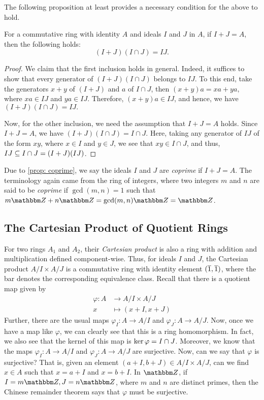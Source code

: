 The following proposition at least provides a necessary condition for the above to hold.
\begin{proposition}\label{prop: coprime}
    For a commutative ring with identity $A$ and ideals $I$ and $J$ in $A$, if $I+J = A$, then the following holds:
    \[(I+J)(I \cap J)=I J.\]
\end{proposition}
\begin{proof}
    We claim that the first inclusion holds in general. Indeed, it suffices to show that every generator of $(I+J)(I \cap J)$ belongs to $IJ$. To this end, take the generators $x+y$ of $(I+J)$ and $a$ of $I\cap J$, then $(x+y)a = xa + ya,$ where $xa \in IJ$ and $ya \in IJ$. Therefore, $(x+y)a \in IJ$, and hence, we have $(I+J)(I \cap J)=I J.$
    
    Now, for the other inclusion, we need the assumption that $I+J=A$ holds. Since $I+J = A$, we have $(I+J)(I\cap J) = I \cap J$. Here, taking any generator of $IJ$ of the form $xy$, where $x \in I$ and $y \in J$, we see that $xy \in I \cap J$, and thus, $IJ \ss I \cap J = (I+J)(IJ)$.
\end{proof}
Due to \cref{prop: coprime}, we say the ideals $I$ and $J$ are {\it coprime} if $I+J = A$. The terminology again came from the ring of integers, where two integers $m$ and $n$ are said to be {\it coprime} if $\operatorname{gcd}(m,n) = 1$ such that $m {\Z}+n {\Z}=\operatorname{gcd}(m, n) {\Z} = \Z$.

\subsection{The Cartesian Product of Quotient Rings}
For two rings $A_{1}$ and $A_{2}$, their {\it Cartesian product} is also a ring with addition and multiplication 
 defined component-wise. Thus, for ideals $I$ and $J$, the Cartesian product $A / I \times A / J$ is a commutative ring with identity element $(\ol{1}, \ol{1})$, where the bar denotes the corresponding equivalence class. Recall that there is a quotient map given by
    $$
    \begin{aligned}
    \varphi: A & \rightarrow A / I \times A / J \\
    x & \mapsto(x+I, x+J)
    \end{aligned}
    $$
 Further, there are the usual maps $\varphi_I: A \rightarrow A / I$
 and $\varphi_J: A \rightarrow A / J$.
Now, once we have a map like $\varphi$, we can clearly see that this is a ring homomorphism. In fact, we also see that the kernel of this map is $\Ker{\varphi} = I \cap J$. Moreover, we know that the maps $\varphi_I: A \rightarrow A / I$ and $\varphi_J: A \rightarrow A / J$ are surjective. Now, can we say that $\varphi$ is surjective? That is, given an element $(a+I, b+J) \in A / I \times A / J$, can we find $x \in A$ such that $x = a + I$ and $x = b + I$. In ${\Z}$, if $I = m\Z, J = n\Z$, where $m$ and $n$ are distinct primes, then the Chinese remainder theorem says that $\varphi$ must be surjective. 

